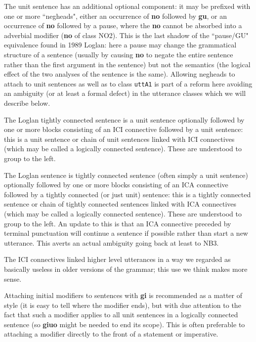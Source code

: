 \documentclass[12pt]{book}
\begin{document}
{\begin{description}
\end{description}

The unit sentence has an additional optional component:  it may be prefixed with one or more ``negheads", either an occurrence of {\bf no} followed
by {\bf gu}, or an occurrence of {\bf no} followed by a pause, where the {\bf no} cannot be absorbed into a adverbial modifier ({\bf no} of class NO2).  This is the last shadow of the ``pause/GU" equivalence found in 1989 Loglan:  here a pause may change the grammatical structure of a sentence (usually by causing {\bf no}
to negate the entire sentence rather than the first argument in the sentence) but not the semantics (the logical effect of the two analyses of the sentence is the same).  Allowing negheads to attach to unit sentences as well as to class {\tt uttA1} is part of a reform here avoiding an ambiguity (or at least a formal defect) in the utterance classes which we will describe below.

The Loglan tightly connected sentence is  a unit sentence optionally followed by one or more blocks consisting of an ICI connective followed by a unit sentence:  this is a unit sentence or chain of unit sentences linked with ICI connectives (which may be called a logically connected sentence).  These are understood to group to the left.  

The Loglan sentence is  tightly connected sentence (often simply a unit sentence) optionally followed by one or more blocks consisting of an  ICA connective followed by a tightly connected (or just unit) sentence:  this is a tightly connected sentence or chain of tightly connected sentences linked with ICA connectives (which may be called a logically connected sentence).  These are understood to group to the left.   An update to this is that an ICA connective preceded by terminal punctuation will continue a sentence if possible rather than start a new utterance.  This averts an actual ambiguity going back at least to NB3.

The ICI connectives linked higher level utterances in a way we regarded as basically useless in older versions of the grammar;  this use we think makes more sense.

Attaching initial modifiers to sentences with {\bf gi} is recommended as a matter of style (it is easy to tell where the modifier ends), but with due attention to the fact that such a modifier applies to all unit sentences in a logically connected sentence (so {\bf giuo} might be needed to end its scope).  This is often preferable to attaching a modifier directly to the front of a statement or imperative.

}
\end{document}

